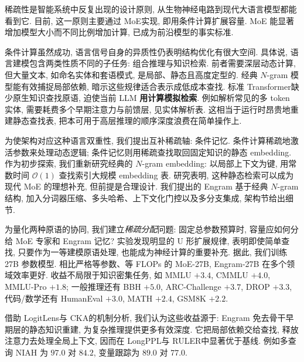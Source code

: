 稀疏性是智能系统中反复出现的设计原则, 从生物神经电路\cite{engram-olshausen1997sparse,engram-lennie2003cost}到现代大语言模型都能看到它. 目前, 这一原则主要通过 MoE\cite{engram-shazeer2017outrageously,engram-dai2024deepseekmoe}实现, 即用条件计算扩展容量. MoE 能显著增加模型大小而不同比例增加计算, 已成为前沿模型的事实标准\cite{engram-guo2025deepseek,engram-comanici2025gemini,engram-kimi-k2}.

条件计算虽然成功, 语言信号自身的异质性仍表明结构优化有很大空间. 具体说, 语言建模包含两类性质不同的子任务: 组合推理与知识检索. 前者需要深层动态计算, 但大量文本, 如命名实体和套语模式, 是局部、静态且高度定型的\cite{engram-erman2000idiom,engram-constant2017survey}. 经典 $N$-gram 模型\cite{engram-liu2024infini,engram-nguyen2024understanding,engram-brants-etal-2007-large}能有效捕捉局部依赖, 暗示这些规律适合表示成低成本查找. 标准 Transformer\cite{engram-vaswani2017attention}缺少原生知识查找原语, 迫使当前 LLM \textbf{用计算模拟检索}. 例如解析常见的多 token 实体, 需要耗费多个早期注意力与前馈层\cite{engram-ghandeharioun2024patchscopes,engram-DBLP:conf/coling/JinYHZWH0MMDYDZ25}, 见实体解析表. 这相当于运行时昂贵地重建静态查找表, 把本可用于高层推理的顺序深度浪费在简单操作上.

为使架构对应这种语言双重性, 我们提出互补稀疏轴: 条件记忆. 条件计算稀疏地激活参数来处理动态逻辑\cite{engram-shazeer2017outrageously,engram-bengio2013estimatingpropagatinggradientsstochastic}; 条件记忆则用稀疏查找取回固定知识的静态 embedding. 作为初步探索, 我们重新研究经典的 $N$-gram embedding\cite{engram-bojanowski2017enriching}: 以局部上下文为键, 用常数时间 $\mathcal O(1)$ 查找索引大规模 embedding 表\cite{engram-tito2017hash,engram-huang2025over,engram-pagnoni2025byte,engram-yu2025scaling}. 研究表明, 这种静态检索可以成为现代 MoE 的理想补充, 但前提是合理设计. 我们提出的 Engram 基于经典 $N$-gram 结构, 加入分词器压缩、多头哈希、上下文化门控以及多分支集成, 架构节给出细节.

为量化两种原语的协同, 我们建立\emph{稀疏分配}问题: 固定总参数预算时, 容量应如何分给 MoE 专家和 Engram 记忆? 实验发现明显的 U 形扩展规律, 表明即使简单查找, 只要作为一等建模原语处理, 也能成为神经计算的重要补充. 据此, 我们训练 27B 参数模型. 相比严格等参数、等 FLOPs 的 MoE-27B, Engram-27B 在多个领域效率更好. 收益不局限于知识密集任务, 如 MMLU $+3.4$, CMMLU $+4.0$, MMLU-Pro $+1.8$; 一般推理还有 BBH $+5.0$, ARC-Challenge $+3.7$, DROP $+3.3$, 代码/数学还有 HumanEval $+3.0$, MATH $+2.4$, GSM8K $+2.2$.

借助 LogitLens\cite{engram-nostalgebraist2020logitlens}与 CKA\cite{engram-hendrycks2020measuring}的机制分析, 我们认为这些收益源于: Engram 免去骨干早期层的静态知识重建, 为复杂推理提供更多有效深度. 它把局部依赖交给查找, 释放注意力去处理全局上下文, 因而在 LongPPL\cite{engram-fangwrong}与 RULER\cite{engram-hsiehruler}中显著优于基线. 例如多查询 NIAH 为 $97.0$ 对 $84.2$, 变量跟踪为 $89.0$ 对 $77.0$.

